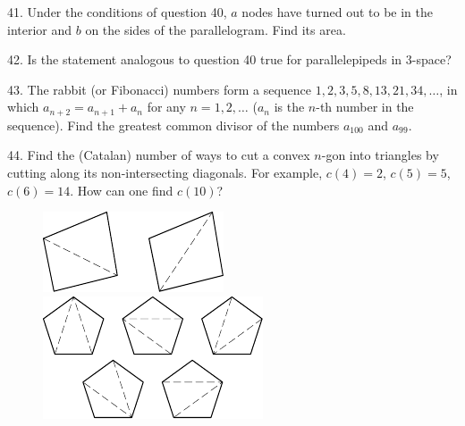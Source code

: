 \begin{problem}{41.}
	Under the conditions of question 40, $a$ nodes have turned out to be in the interior and $b$ on the sides of the parallelogram. Find its area. 
\end{problem}

\begin{problem}{42.}
	Is the statement analogous to question 40 true for parallelepipeds in 3-space?
\end{problem}

\begin{problem}{43.}
	The rabbit (or Fibonacci) numbers form a sequence $1,2,3,5,8,\allowbreak 13,21,34,\dotsc$, in which $a_{n+2}=a_{n+1}+a_n$ for any
	$n=1,2,\dotsc$ ($a_n$ is the $n$-th number in the sequence). Find the greatest common divisor of the numbers $a_{100}$ and $a_{99}$.
\end{problem}

\begin{problem}{44.}
	Find the (Catalan) number of ways to cut a convex $n$-gon into triangles by cutting along its non-intersecting diagonals. 
	For example, $c(4)=2$, $c(5)=5$, $c(6)=14$. How can one find $c(10)$?
	\begin{figure}
		\includegraphics{taskbook-281}
		\qquad
		\includegraphics{taskbook-282}
	\end{figure}
\end{problem}

